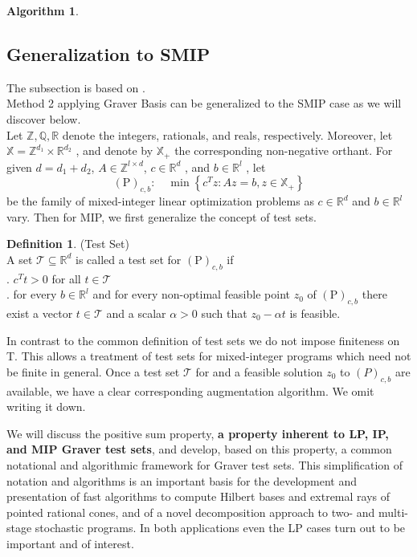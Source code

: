 \documentclass{article}
\theoremstyle{plain}
\theoremstyle{definition}
\newtheorem{definition}[theorem]{Definition}
\newtheorem{algorithm}[theorem]{Algorithm}
\begin{document}
\begin{algorithm}
\subsection{Generalization to SMIP }
The subsection is based on \cite{ref1}. \\

Method 2 applying Graver Basis can be generalized to the SMIP case as we will discover below. \\

Let  $\mathbb{Z}, \mathbb{Q}, \mathbb{R}$  denote the integers, rationals, and reals, respectively. Moreover, let  $\mathbb{X}=\mathbb{Z}^{d_{1}} \times \mathbb{R}^{d_{2}}$ , and denote by $ \mathbb{X}_{+}$ the corresponding non-negative orthant. For given $ d=d_{1}+d_{2}$, $A \in \mathbb{Z}^{l \times d}$, $c \in \mathbb{R}^{d}$ , and  $b \in \mathbb{R}^{l}$ , let $$ (\mathrm{P})_{c, b}: \quad \min \left\{c^{T} z: A z=b, z \in \mathbb{X}_{+}\right\} $$
be the family of mixed-integer linear optimization problems as  $c \in \mathbb{R}^{d}$  and  $b \in \mathbb{R}^{l}$  vary. Then for MIP, we first generalize the concept of test sets. \\

\begin{definition} (Test Set)\\
 A  set  $\mathcal{T} \subseteq \mathbb{R}^{d}$  is called a test set for $ (\mathrm{P})_{c, b}$  if \\
.  $c^{T} t>0$  for all $ t \in \mathcal{T}$ \\
. for every $ b \in \mathbb{R}^{l}$  and for every non-optimal feasible point  $z_{0}$  of $ (\mathrm{P})_{c, b}$  there exist a vector  $t \in \mathcal{T}$  and a scalar  $\alpha>0$  such that  $z_{0}-\alpha t$  is feasible.
\end{definition}

In contrast to the common definition of test sets we do not impose finiteness on T. This allows a treatment of test sets for mixed-integer programs which need not be finite
in general. Once a test set $\mathcal{T}$ for and a feasible solution $z_0$ to $(P)_{c,b}$ are available, we have a clear corresponding augmentation algorithm. We omit writing it down. 

We will discuss the positive sum property, \textbf{a property inherent to LP, IP, and MIP Graver test sets}, and develop, based on this property, a common notational and algorithmic framework for Graver test sets. This simplification of notation and algorithms is an important basis for the development and presentation of fast algorithms to compute Hilbert bases and extremal rays of pointed rational cones, and of a novel decomposition approach to two- and multi-stage stochastic programs. In both applications even the LP cases turn out to be important and of interest.


\end{algorithm}
\end{document}
